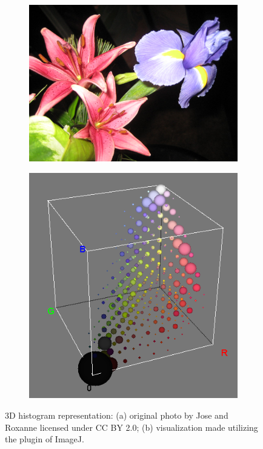 \begin{figure}[h]
     \centering
     \begin{subfigure}[b]{0.45\textwidth}
         \centering
         \includegraphics[width=\textwidth]{images/approaches/statistical/3d-hist-orig.jpg}
         \caption{}
         \label{fig:3d-hist-orig}
     \end{subfigure}
     \hfill
     \begin{subfigure}[b]{0.45\textwidth}
         \centering
         \includegraphics[width=\textwidth]{images/approaches/statistical/3d-hist-plug.png}
         \caption{}
         \label{fig:3d-hist-plug}
     \end{subfigure}
        \caption[footnote-3d]{3D histogram representation: (a) original photo by Jose and Roxanne licensed under CC BY 2.0; (b) visualization made utilizing the  plugin of ImageJ.\footnotemark}
        \label{fig:3d-hist}
\end{figure}
